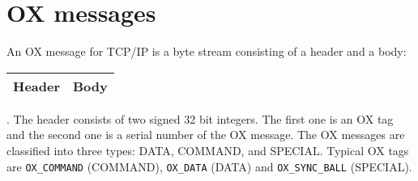 
\section{OX messages}

An OX message for TCP/IP is a byte stream consisting of
a header and a body: 
\begin{tabular}{|c|c|}
\hline
Header	& \hspace{10mm} Body \hspace{10mm} \\
\hline
\end{tabular}.
The header consists of two signed 32 bit integers.
The first one is an OX tag 
and the second one is a serial number of the OX message.
The OX messages are classified into three types:
DATA, COMMAND, and SPECIAL.
Typical OX tags are 
\verb+OX_COMMAND+ (COMMAND), \verb+OX_DATA+ (DATA) and \verb+OX_SYNC_BALL+ (SPECIAL).



%
